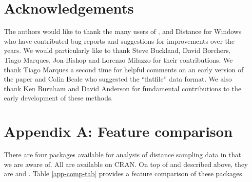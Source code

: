 \documentclass[article]{jss}\usepackage[]{graphicx}\usepackage[]{color}
\begin{document}
\section{Acknowledgements}

The authors would like to thank the many users of ,  and Distance for Windows who have contributed bug reports and suggestions for improvements over the years. We would particularly like to thank Steve Buckland, David Borchers, Tiago Marques, Jon Bishop and Lorenzo Milazzo for their contributions. We thank Tiago Marques a second time for helpful comments on an early version of the paper and Colin Beale who suggested the ``flatfile'' data format. We also thank Ken Burnham and David Anderson for fundamental contributions to the early development of these methods.


\appendix

\section*{Appendix A: Feature comparison}

There are four packages available for analysis of distance sampling data in  that we are aware of. All are available on CRAN. On top of  and  \citep{mrds-pkg} described above, they are  \citep{Rdistance-pkg} and  \citep{Fiske:2011gv}. Table \ref{app-comp-tab} provides a feature comparison of these packages.
\end{document}
